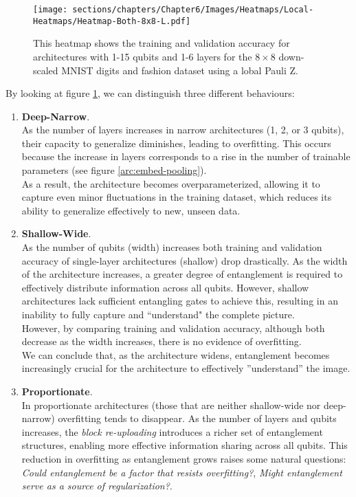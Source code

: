 
\begin{figure}[h]
    \centering
    \texttt{[image: sections/chapters/Chapter6/Images/Heatmaps/Local-Heatmaps/Heatmap-Both-8x8-L.pdf]}
    \caption{This heatmap shows the training and validation accuracy for architectures with 1-15 qubits and
    1-6 layers for the $8\times8$ down-scaled MNIST digits and fashion dataset using a lobal Pauli Z.}
    \label{fig:heatmap-8x8-L}
\end{figure}
By looking at figure \ref{fig:heatmap-8x8-L}, we can distinguish 
three different behaviours:

\begin{enumerate}
    \item \textbf{Deep-Narrow}.\\
    As the number of layers increases in narrow architectures (1, 2, or 3 qubits), their capacity to 
    generalize diminishes, leading to overfitting. This occurs because the increase in layers corresponds 
    to a rise in the number of trainable parameters (see figure \ref{arc:embed-pooling}).\\
    As a result, the architecture becomes overparameterized, allowing it to capture even minor 
    fluctuations in the training dataset, which reduces its ability to generalize effectively to new, 
    unseen data.
    \item \textbf{Shallow-Wide}.\\
    As the number of qubits (width) increases both training and validation accuracy of 
    single-layer architectures (shallow) drop drastically.
    As the width of the architecture increases, a greater degree of entanglement is required to 
    effectively distribute information across all qubits. However, shallow architectures lack 
    sufficient entangling gates to achieve this, resulting in an inability to fully capture and 
    “understand" the complete picture.\\
    However, by comparing training and validation accuracy, although both decrease as 
    the width increases, there is no evidence of overfitting.\\
    We can conclude that, as the architecture widens, entanglement becomes increasingly crucial for the 
    architecture to effectively ”understand” the image.
    \item \textbf{Proportionate}.\\
    In proportionate architectures (those that are neither shallow-wide nor deep-narrow) overfitting 
    tends to disappear. As the number of layers and qubits increases, the \textit{block re-uploading} 
    introduces a richer set of entanglement structures, enabling more effective information sharing 
    across all qubits. This reduction in overfitting as entanglement grows raises some natural questions:
    \textit{Could entanglement be a factor that resists overfitting?}, 
    \textit{Might entanglement serve as a source of regularization?}.
\end{enumerate}
